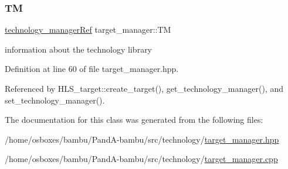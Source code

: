 \subsubsection{\texorpdfstring{TM}{TM}}
{\footnotesize\ttfamily \hyperlink{technology__manager_8hpp_a4b9ecd440c804109c962654f9227244e}{technology\+\_\+manager\+Ref} target\+\_\+manager\+::\+TM\hspace{0.3cm}{\ttfamily [protected]}}



information about the technology library 



Definition at line 60 of file target\+\_\+manager.\+hpp.



Referenced by H\+L\+S\+\_\+target\+::create\+\_\+target(), get\+\_\+technology\+\_\+manager(), and set\+\_\+technology\+\_\+manager().



The documentation for this class was generated from the following files\+:\begin{DoxyCompactItemize}
\item 
/home/osboxes/bambu/\+Pand\+A-\/bambu/src/technology/\hyperlink{target__manager_8hpp}{target\+\_\+manager.\+hpp}\item 
/home/osboxes/bambu/\+Pand\+A-\/bambu/src/technology/\hyperlink{target__manager_8cpp}{target\+\_\+manager.\+cpp}\end{DoxyCompactItemize}
